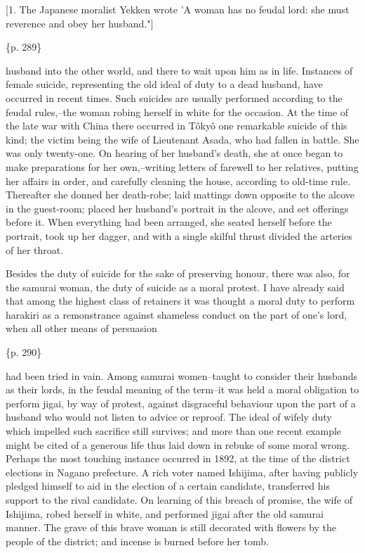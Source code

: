 [1. The Japanese moralist Yekken wrote 'A woman has no feudal lord: she must reverence and obey her husband."]

\{p. 289\}

husband into the other world, and there to wait upon him as in life. Instances of female suicide, representing the old ideal of duty to a dead husband, have occurred in recent times. Such suicides are usually performed according to the feudal rules,--the woman robing herself in white for the occasion. At the time of the late war with China there occurred in Tôkyô one remarkable suicide of this kind; the victim being the wife of Lieutenant Asada, who had fallen in battle. She was only twenty-one. On hearing of her husband's death, she at once began to make preparations for her own,--writing letters of farewell to her relatives, putting her affairs in order, and carefully cleaning the house, according to old-time rule. Thereafter she donned her death-robe; laid mattings down opposite to the alcove in the guest-room; placed her husband's portrait in the alcove, and set offerings before it. When everything had been arranged, she seated herself before the portrait, took up her dagger, and with a single skilful thrust divided the arteries of her throat.

Besides the duty of suicide for the sake of preserving honour, there was also, for the samurai woman, the duty of suicide as a moral protest. I have already said that among the highest class of retainers it was thought a moral duty to perform harakiri as a remonstrance against shameless conduct on the part of one's lord, when all other means of persuasion

\{p. 290\}

had been tried in vain. Among samurai women--taught to consider their husbands as their lords, in the feudal meaning of the term--it was held a moral obligation to perform jigai, by way of protest, against disgraceful behaviour upon the part of a husband who would not listen to advice or reproof. The ideal of wifely duty which impelled such sacrifice still survives; and more than one recent example might be cited of a generous life thus laid down in rebuke of some moral wrong. Perhaps the most touching instance occurred in 1892, at the time of the district elections in Nagano prefecture. A rich voter named Ishijima, after having publicly pledged himself to aid in the election of a certain candidate, transferred his support to the rival candidate. On learning of this breach of promise, the wife of Ishijima, robed herself in white, and performed jigai after the old samurai manner. The grave of this brave woman is still decorated with flowers by the people of the district; and incense is burned before her tomb.



